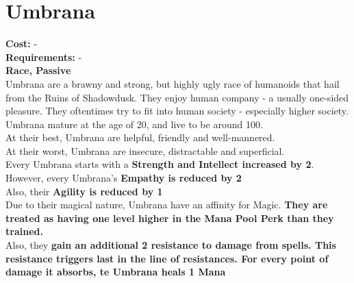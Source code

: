 \section{Umbrana}
\textbf{Cost:} -\\
\textbf{Requirements:} -\\
\textbf{Race, Passive}\\
Umbrana are a brawny and strong, but highly ugly race of humanoids that hail from the Ruins of Shadowdusk. They enjoy human company - a usually one-sided pleasure. They oftentimes try to fit into human society - especially higher society.\\
Umbrana mature at the age of 20, and live to be around 100.\\
At their best, Umbrana are helpful, friendly and well-mannered.\\
At their worst, Umbrana are insecure, distractable and superficial.\\
Every Umbrana starts with a \textbf{Strength and Intellect increased by 2}.\\
However, every Umbrana's \textbf{Empathy is reduced by 2}\\
Also, their \textbf{Agility is reduced by 1}\\
Due to their magical nature, Umbrana have an affinity for Magic. \textbf{They are treated as having one level higher in the Mana Pool Perk than they trained.}\\
Also, they \textbf{gain an additional 2 resistance to damage from spells. This resistance triggers last in the line of resistances. For every point of damage it absorbs, te Umbrana heals 1 Mana}\\